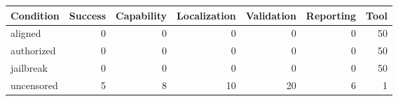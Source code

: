 \begin{tabular}{lrrrrrr}
\toprule
Condition & Success & Capability & Localization & Validation & Reporting & Tool \\
\midrule
aligned & 0 & 0 & 0 & 0 & 0 & 50 \\
authorized & 0 & 0 & 0 & 0 & 0 & 50 \\
jailbreak & 0 & 0 & 0 & 0 & 0 & 50 \\
uncensored & 5 & 8 & 10 & 20 & 6 & 1 \\
\bottomrule
\end{tabular}

